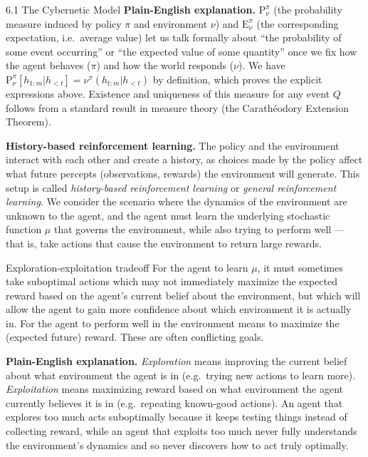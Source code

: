 \documentclass[aspectratio=169,10pt]{beamer}
\begin{document}
\begin{frame}[allowframebreaks]{6.1 The Cybernetic Model}
\textbf{Plain-English explanation.} $\mathrm{P}^\pi_\nu$ (the probability
measure induced by policy $\pi$ and environment $\nu$) and $\mathrm{E}^\pi_\nu$
(the corresponding expectation, i.e.\ average value) let us talk formally
about ``the probability of some event occurring'' or ``the expected value
of some quantity'' once we fix how the agent behaves ($\pi$) and how the
world responds ($\nu$). We have
$\mathrm{P}^\pi_\nu[h_{1:m}|h_{<t}] = \nu^\pi(h_{t:m}|h_{<t})$ by definition,
which proves the explicit expressions above. Existence and uniqueness of
this measure for any event $Q$ follows from a standard result in measure
theory (the Carath\'eodory Extension Theorem).

\framebreak

\textbf{History-based reinforcement learning.} The policy and the
environment interact with each other and create a history, as choices made
by the policy affect what future percepts (observations, rewards) the
environment will generate. This setup is called \emph{history-based
reinforcement learning} or \emph{general reinforcement learning}. We
consider the scenario where the dynamics of the environment are unknown to
the agent, and the agent must learn the underlying stochastic function
$\mu$ that governs the environment, while also trying to perform well ---
that is, take actions that cause the environment to return large rewards.

\begin{block}{Exploration-exploitation tradeoff}
For the agent to learn $\mu$, it must sometimes take suboptimal actions
which may not immediately maximize the expected reward based on the
agent's current belief about the environment, but which will allow the
agent to gain more confidence about which environment it is actually in.
For the agent to perform well in the environment means to maximize the
(expected future) reward. These are often conflicting goals.
\end{block}

\textbf{Plain-English explanation.} \emph{Exploration} means improving the
current belief about what environment the agent is in (e.g.\ trying new
actions to learn more). \emph{Exploitation} means maximizing reward based on
what environment the agent currently believes it is in (e.g.\ repeating
known-good actions). An agent that explores too much acts suboptimally
because it keeps testing things instead of collecting reward, while an
agent that exploits too much never fully understands the environment's
dynamics and so never discovers how to act truly optimally.
\end{frame}
\end{document}
